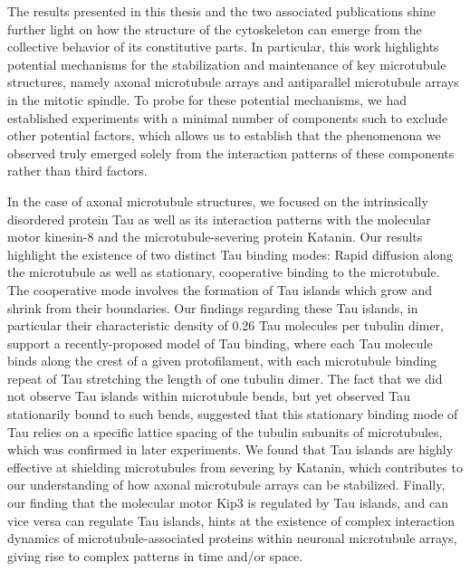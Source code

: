 The results presented in this thesis and the two associated publications  shine further light on how the structure of the cytoskeleton can emerge from the collective behavior of its constitutive parts. In particular, this work highlights potential mechanisms for the stabilization and maintenance of key microtubule structures, namely axonal microtubule arrays and antiparallel microtubule arrays in the mitotic spindle. To probe for these potential mechanisms, we had established experiments with a minimal number of components such to exclude other potential factors, which allows us to establish that the phenomenona we observed truly emerged solely from the interaction patterns of these components rather than third factors.\par

In the case of axonal microtubule structures, we focused on the intrinsically disordered protein Tau as well as its interaction patterns with the molecular motor kinesin-8 and the microtubule-severing protein Katanin. Our results highlight the existence of two distinct Tau binding modes: Rapid diffusion along the microtubule as well as stationary, cooperative binding to the microtubule. The cooperative mode involves the formation of Tau islands which grow and shrink from their boundaries. Our findings regarding these Tau islands, in particular their characteristic density of 0.26 Tau molecules per tubulin dimer, support a recently-proposed model of Tau binding, where each Tau molecule binds along the crest of a given protofilament, with each microtubule binding repeat of Tau stretching the length of one tubulin dimer. The fact that we did not observe Tau islands within microtubule bends, but yet observed Tau stationarily bound to such bends, suggested that this stationary binding mode of Tau relies on a specific lattice spacing of the tubulin subunits of microtubules, which was confirmed in later experiments. We found that Tau islands are highly effective at shielding microtubules from severing by Katanin, which contributes to our understanding of how axonal microtubule arrays can be stabilized. Finally, our finding that the molecular motor Kip3 is regulated by Tau islands, and can vice versa can regulate Tau islands, hints at the existence of complex interaction dynamics of microtubule-associated proteins within neuronal microtubule arrays, giving rise to complex patterns in time and/or space.\par

